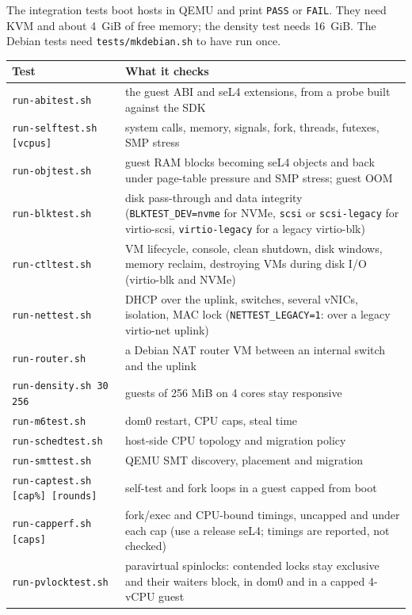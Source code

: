 \documentclass[11pt,a4paper]{report}
\newcommand{\cmd}[1]{\texttt{#1}}
\begin{document}
The integration tests boot hosts in QEMU and print \texttt{PASS} or
\texttt{FAIL}. They need KVM and about 4~GiB of free memory; the density test
needs 16~GiB. The Debian tests need \cmd{tests/mkdebian.sh} to have run once.

\begingroup
\small
\begin{longtable}{@{}>{\raggedright\arraybackslash}p{5.6cm}>{\raggedright\arraybackslash}p{8.9cm}@{}}
\toprule
Test & What it checks \\
\midrule
\endhead
\cmd{run-abitest.sh} & the guest ABI and seL4 extensions, from a probe
  built against the SDK \\
\cmd{run-selftest.sh [vcpus]} & system calls, memory, signals, fork,
  threads, futexes, SMP stress \\
\cmd{run-objtest.sh} & guest RAM blocks becoming seL4 objects and back
  under page-table pressure and SMP stress; guest OOM \\
\cmd{run-blktest.sh} & disk pass-through and data integrity
  (\texttt{BLKTEST\_DEV=nvme} for NVMe, \texttt{scsi} or
  \texttt{scsi-legacy} for virtio-scsi, \texttt{virtio-legacy} for a
  legacy virtio-blk) \\
\cmd{run-ctltest.sh} & VM lifecycle, console, clean shutdown, disk windows,
  memory reclaim, destroying VMs during disk I/O (virtio-blk and NVMe) \\
\cmd{run-nettest.sh} & DHCP over the uplink, switches, several vNICs,
  isolation, MAC lock (\texttt{NETTEST\_LEGACY=1}: over a legacy
  virtio-net uplink) \\
\cmd{run-router.sh} & a Debian NAT router VM between an internal switch and
  the uplink \\
\cmd{run-density.sh 30 256} & 30 guests of 256 MiB on 4 cores stay
  responsive \\
\cmd{run-m6test.sh} & dom0 restart, CPU caps, steal time \\
\cmd{run-schedtest.sh} & host-side CPU topology and migration policy \\
\cmd{run-smttest.sh} & QEMU SMT discovery, placement and migration \\
\cmd{run-captest.sh [cap\%] [rounds]} & self-test and fork loops in a guest
  capped from boot \\
\cmd{run-capperf.sh [caps]} & fork/exec and CPU-bound timings, uncapped and
  under each cap (use a release seL4; timings are reported, not checked) \\
\cmd{run-pvlocktest.sh} & paravirtual spinlocks: contended locks stay
  exclusive and their waiters block, in dom0 and in a capped 4-vCPU guest \\

\end{longtable}
\end{document}
